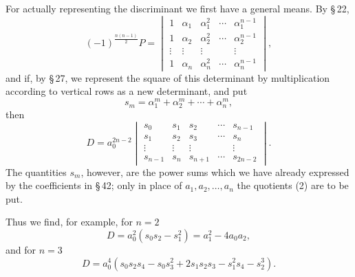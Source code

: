 \documentclass[11pt]{article}
\begin{document}
For actually representing the discriminant we first have a general means. By \S\,22,
\begin{equation}
 (-1)^{\frac{n(n-1)}2}P=
 \begin{vmatrix}
 1&\alpha_1&\alpha_1^2&\cdots&\alpha_1^{n-1}\\
 1&\alpha_2&\alpha_2^2&\cdots&\alpha_2^{n-1}\\
 \vdots&\vdots&\vdots&&\vdots\\
 1&\alpha_n&\alpha_n^2&\cdots&\alpha_n^{n-1}
 \end{vmatrix},
\tag{6}
\end{equation}
and if, by \S\,27, we represent the square of this determinant by multiplication according to vertical rows as a new determinant, and put
\[
 s_m=\alpha_1^m+\alpha_2^m+\cdots+\alpha_n^m,
\]
then
\begin{equation}
 D=a_0^{2n-2}
 \begin{vmatrix}
 s_0&s_1&s_2&\cdots&s_{n-1}\\
 s_1&s_2&s_3&\cdots&s_n\\
 \vdots&\vdots&\vdots&&\vdots\\
 s_{n-1}&s_n&s_{n+1}&\cdots&s_{2n-2}
 \end{vmatrix}.
\tag{7}
\end{equation}
The quantities \(s_m\), however, are the power sums which we have already expressed by the coefficients in \S\,42; only in place of \(a_1,a_2,\ldots,a_n\) the quotients (2) are to be put.

Thus we find, for example, for \(n=2\)
\begin{equation}
 D=a_0^2(s_0s_2-s_1^2)=a_1^2-4a_0a_2,
\tag{8}
\end{equation}
and for \(n=3\)
\begin{equation}
 D=a_0^4(s_0s_2s_4-s_0s_3^2+2s_1s_2s_3-s_1^2s_4-s_2^3).
\tag{9}
\end{equation}
\end{document}
